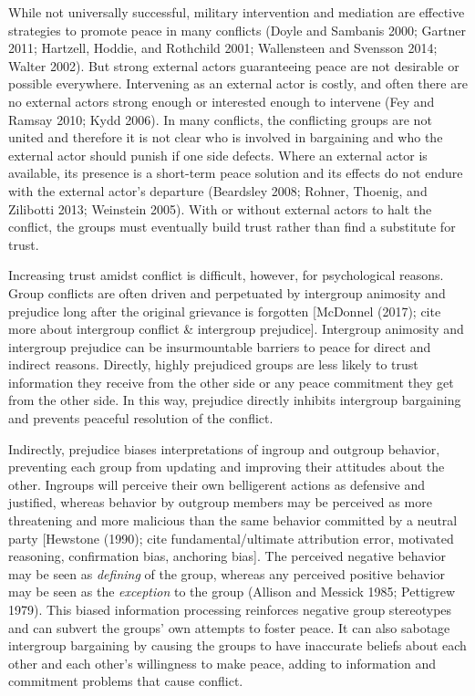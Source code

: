 \documentclass[11pt]{article}
\begin{document}
While not universally successful, military intervention and mediation
are effective strategies to promote peace in many conflicts (Doyle and
Sambanis 2000; Gartner 2011; Hartzell, Hoddie, and Rothchild 2001;
Wallensteen and Svensson 2014; Walter 2002). But strong external actors
guaranteeing peace are not desirable or possible everywhere. Intervening
as an external actor is costly, and often there are no external actors
strong enough or interested enough to intervene (Fey and Ramsay 2010;
Kydd 2006). In many conflicts, the conflicting groups are not united and
therefore it is not clear who is involved in bargaining and who the
external actor should punish if one side defects. Where an external
actor is available, its presence is a short-term peace solution and its
effects do not endure with the external actor's departure (Beardsley
2008; Rohner, Thoenig, and Zilibotti 2013; Weinstein 2005). With or
without external actors to halt the conflict, the groups must eventually
build trust rather than find a substitute for trust.

Increasing trust amidst conflict is difficult, however, for
psychological reasons. Group conflicts are often driven and perpetuated
by intergroup animosity and prejudice long after the original grievance
is forgotten {[}McDonnel (2017); cite more about intergroup conflict \&
intergroup prejudice{]}. Intergroup animosity and intergroup prejudice
can be insurmountable barriers to peace for direct and indirect reasons.
Directly, highly prejudiced groups are less likely to trust information
they receive from the other side or any peace commitment they get from
the other side. In this way, prejudice directly inhibits intergroup
bargaining and prevents peaceful resolution of the conflict.

Indirectly, prejudice biases interpretations of ingroup and outgroup
behavior, preventing each group from updating and improving their
attitudes about the other. Ingroups will perceive their own belligerent
actions as defensive and justified, whereas behavior by outgroup members
may be perceived as more threatening and more malicious than the same
behavior committed by a neutral party {[}Hewstone (1990); cite
fundamental/ultimate attribution error, motivated reasoning,
confirmation bias, anchoring bias{]}. The perceived negative behavior
may be seen as \emph{defining} of the group, whereas any perceived
positive behavior may be seen as the \emph{exception} to the group
(Allison and Messick 1985; Pettigrew 1979). This biased information
processing reinforces negative group stereotypes and can subvert the
groups' own attempts to foster peace. It can also sabotage intergroup
bargaining by causing the groups to have inaccurate beliefs about each
other and each other's willingness to make peace, adding to information
and commitment problems that cause conflict.
\end{document}
